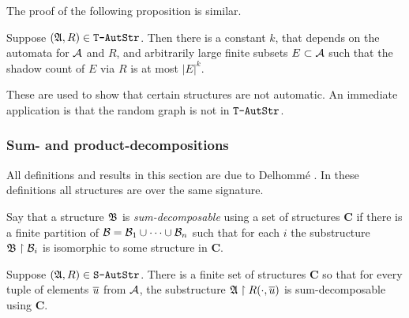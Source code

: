 The proof of the following proposition is similar.
\begin{proposition}
Suppose $(\mathfrak{A},R) \in \mbox{\tt T-AutStr}$.
Then there is a constant $k$, 
that depends on the automata for ${\mathcal A}$ and $R$, and arbitrarily large finite subsets $E \subset {{\mathcal A}}$ such
that the shadow count of $E$ via $R$  is at most $|E|^k$.
\end{proposition}

These are used to show that certain structures are not automatic. An immediate application is that the random graph is not in $\mbox{\tt T-AutStr}$.

\subsubsection*{Sum- and product-decompositions}

All definitions and results in this section are due to Delhomm\'e \cite{Delh04}.
In these definitions all structures are over the same signature.

\begin{definition} 
Say that a structure $\mathfrak{B}$ is {\em sum-decomposable} using a set of structures
$\mathbf{C}$ if there is a finite partition of ${\mathcal B}
= {\mathcal B}_1 \cup \cdots \cup {\mathcal B}_n$ such that for each $i$ the substructure $\mathfrak{B}
\restriction {\mathcal B}_i$ is isomorphic to some structure in $\mathbf{C}$.
\end{definition}


\begin{theorem} \label{AS:thm:sumaug}
Suppose $(\mathfrak{A},R) \in \mbox{\tt S-AutStr}$.
There is a finite set of
structures $\mathbf{C}$ so that for every tuple of elements $\mbox{$\overline {u}$}$ from ${\mathcal A}$, the
substructure ${\mathfrak{A}} \restriction R(\cdot,\mbox{$\overline {u}$})$ is sum-decomposable using $\mathbf{C}$.
\end{theorem}

